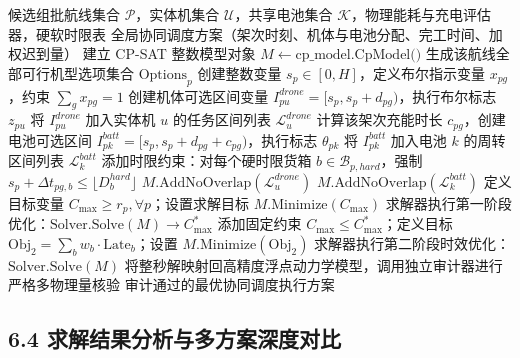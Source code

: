 \documentclass[withoutpreface,bwprint]{format}
\begin{document}
\begin{algorithm}[H]
\caption{基于 CP-SAT 的异构无人机与共享电池协同排程算法}
\label{alg:cpsat_scheduler}
\begin{algorithmic}[1]
\Require 候选组批航线集合 $\mathcal{P}$，实体机集合 $\mathcal{U}$，共享电池集合 $\mathcal{K}$，物理能耗与充电评估器，硬软时限表
\Ensure 全局协同调度方案（架次时刻、机体与电池分配、完工时间、加权迟到量）
\State 建立 CP-SAT 整数模型对象 $M \gets \text{cp\_model.CpModel()}$
    \State 生成该航线全部可行机型选项集合 $\text{Options}_p$
    \State 创建整数变量 $s_p \in [0, H]$，定义布尔指示变量 $x_{pg}$，约束 $\sum_{g} x_{pg} = 1$
            \State 创建机体可选区间变量 $I_{pu}^{drone} = [s_p, s_p + d_{pg})$，执行布尔标志 $z_{pu}$
            \State 将 $I_{pu}^{drone}$ 加入实体机 $u$ 的任务区间列表 $\mathcal{L}_u^{drone}$
        \EndFor
            \State 计算该架次充能时长 $c_{pg}$，创建电池可选区间 $I_{pk}^{batt} = [s_p, s_p + d_{pg} + c_{pg})$，执行标志 $\theta_{pk}$
            \State 将 $I_{pk}^{batt}$ 加入电池 $k$ 的周转区间列表 $\mathcal{L}_k^{batt}$
        \EndFor
        \State 添加时限约束：对每个硬时限货箱 $b \in \mathcal{B}_{p, hard}$，强制 $s_p + \Delta t_{pg, b} \le \lfloor D_b^{hard} \rfloor$
    \EndFor
\EndFor
{}
    \State $M.\text{AddNoOverlap}(\mathcal{L}_u^{drone})$ 
\EndFor
{}
    \State $M.\text{AddNoOverlap}(\mathcal{L}_k^{batt})$ 
\EndFor
\State 定义目标变量 $C_{\max} \ge r_p, \forall p$；设置求解目标 $M.\text{Minimize}(C_{\max})$
\State 求解器执行第一阶段优化：$\text{Solver}.\text{Solve}(M) \to C_{\max}^*$
\State 添加固定约束 $C_{\max} \le C_{\max}^*$；定义目标 $\text{Obj}_2 = \sum_b w_b \cdot \text{Late}_b$；设置 $M.\text{Minimize}(\text{Obj}_2)$
\State 求解器执行第二阶段时效优化：$\text{Solver}.\text{Solve}(M)$
\State 将整秒解映射回高精度浮点动力学模型，调用独立审计器进行严格多物理量核验
\State \Return 审计通过的最优协同调度执行方案
\end{algorithmic}
\end{algorithm}

\subsection{6.4 求解结果分析与多方案深度对比}
\end{document}
